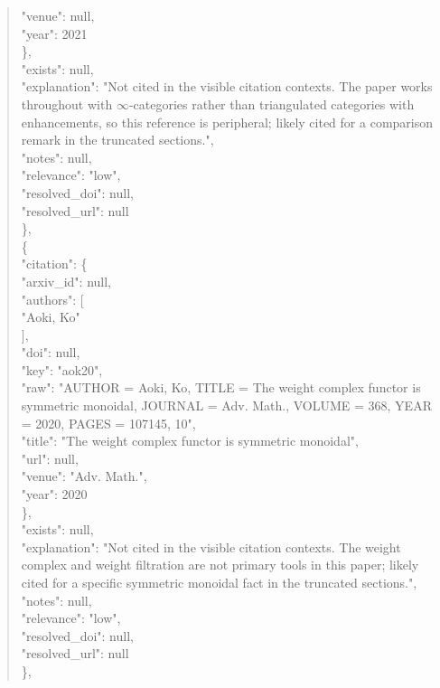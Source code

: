 \documentclass[11pt]{article}
\begin{document}
\begin{quote}
        "venue": null,\\
        "year": 2021\\
      \},\\
      "exists": null,\\
      "explanation": "Not cited in the visible citation contexts. The paper works throughout with \ensuremath{\infty}-categories rather than triangulated categories with enhancements, so this reference is peripheral; likely cited for a comparison remark in the truncated sections.",\\
      "notes": null,\\
      "relevance": "low",\\
      "resolved\_doi": null,\\
      "resolved\_url": null\\
    \},\\
    \{\\
      "citation": \{\\
        "arxiv\_id": null,\\
        "authors": [\\
          "Aoki, Ko"\\
        ],\\
        "doi": null,\\
        "key": "aok20",\\
        "raw": "AUTHOR = Aoki, Ko, TITLE = The weight complex functor is symmetric monoidal, JOURNAL = Adv. Math., VOLUME = 368, YEAR = 2020, PAGES = 107145, 10",\\
        "title": "The weight complex functor is symmetric monoidal",\\
        "url": null,\\
        "venue": "Adv. Math.",\\
        "year": 2020\\
      \},\\
      "exists": null,\\
      "explanation": "Not cited in the visible citation contexts. The weight complex and weight filtration are not primary tools in this paper; likely cited for a specific symmetric monoidal fact in the truncated sections.",\\
      "notes": null,\\
      "relevance": "low",\\
      "resolved\_doi": null,\\
      "resolved\_url": null\\
    \},\\

\end{quote}
\end{document}
